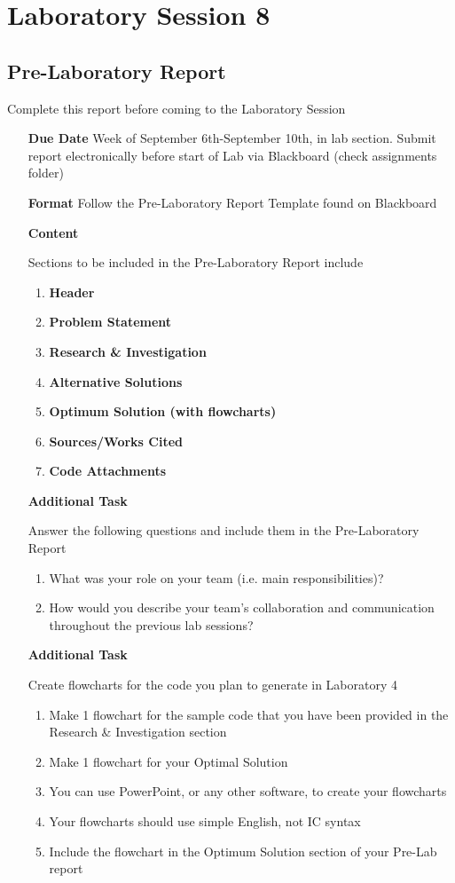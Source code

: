 \chapter{Laboratory Session 8}
\section{Pre-Laboratory Report}
	Complete this report before coming to the Laboratory Session
\begin{itemize}
	\item[\textbf{Due Date}]{Week of September 6th-September 10th, \the\year \space in lab section. Submit report electronically before start of Lab via Blackboard (check assignments folder)}
	\item[\textbf{Format}]{Follow the Pre-Laboratory Report Template found on Blackboard}
	\item[\textbf{Content}]{Sections to be included in the Pre-Laboratory Report include
		\begin{enumerate}
			\item \textbf{Header}
			\item \textbf{Problem Statement}
			\item \textbf{Research \& Investigation}
			\item \textbf{Alternative Solutions}
			\item \textbf{Optimum Solution (with flowcharts)}
			\item \textbf{Sources/Works Cited}
			\item \textbf{Code Attachments}
		\end{enumerate}
		
	}

	\item[\textbf{Additional Task}]{Answer the following questions and include them in the Pre-Laboratory Report
		\begin{enumerate}[label=\alph*.]
			\item What was your role on your team (i.e. main responsibilities)? 
			\item How would you describe your team’s collaboration and communication throughout the previous lab sessions? 
		\end{enumerate}	
	}

	\item[\textbf{Additional Task}]{Create flowcharts for the code you plan to generate in Laboratory 4
		\begin{enumerate}[label=\alph*.]
			\item Make 1 flowchart for the sample code that you have been provided in the Research \& Investigation section 
			\item Make 1 flowchart for your Optimal Solution
			\item You can use PowerPoint, or any other software, to create your flowcharts
			\item Your flowcharts should use simple English, not IC syntax
			\item Include the flowchart in the Optimum Solution section of your Pre-Lab report
		\end{enumerate}	
	}
\end{itemize}
